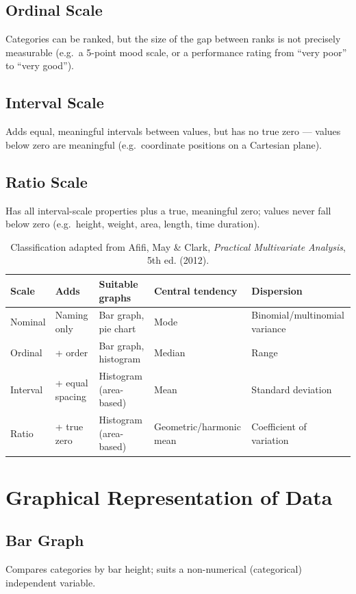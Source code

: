 \documentclass[11pt]{article}
\begin{document}
	\subsection{Ordinal Scale}
	Categories can be ranked, but the size of the gap between ranks is not precisely measurable (e.g.\ a 5-point mood scale, or a performance rating from ``very poor'' to ``very good'').
	
	\subsection{Interval Scale}
	Adds equal, meaningful intervals between values, but has no true zero --- values below zero are meaningful (e.g.\ coordinate positions on a Cartesian plane).
	
	\subsection{Ratio Scale}
	Has all interval-scale properties plus a true, meaningful zero; values never fall below zero (e.g.\ height, weight, area, length, time duration).
	
	\begin{table}[h!]
		\centering
		\small
		\begin{tabularx}{\textwidth}{@{}l X X X X@{}}
			\toprule
			\textbf{Scale} & \textbf{Adds} & \textbf{Suitable graphs} & \textbf{Central tendency} & \textbf{Dispersion} \\
			\midrule
			Nominal & Naming only & Bar graph, pie chart & Mode & Binomial/multinomial variance \\
			Ordinal & + order & Bar graph, histogram & Median & Range \\
			Interval & + equal spacing & Histogram (area-based) & Mean & Standard deviation \\
			Ratio & + true zero & Histogram (area-based) & Geometric/harmonic mean & Coefficient of variation \\
			\bottomrule
		\end{tabularx}
		\caption*{\small Classification adapted from Afifi, May \& Clark, \textit{Practical Multivariate Analysis}, 5th ed. (2012).}
	\end{table}
	
	
	\section{Graphical Representation of Data}

	
	\subsection{Bar Graph}
	Compares categories by bar height; suits a non-numerical (categorical) independent variable.
	
\end{document}
